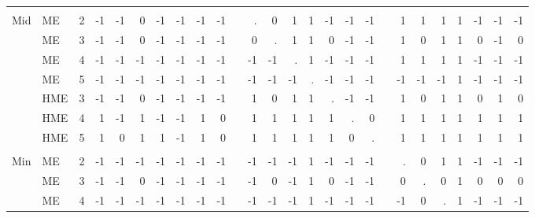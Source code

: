 \documentclass[12pt]{article}
\theoremstyle{definition}
\begin{document}
\begin{landscape}
\begin{table}[t!]
\begin{threeparttable}
{\begin{tabular}[r]{l l l r r r r r r r r r r r r r r r r r r r r r r r}
         &     &         &     &     &     &     &      &      &              &&     &     &     &     &      &      &              &&     &     &     &     &      &      &          \\
Mid      & ME  & 2       & -1  & -1  &  0  & -1  & -1   & -1   &  -1          &&  .  &   0 &  1  &  1  & -1   & -1   &  -1          &&  1  &  1  &  1  &  1  & -1   & -1   & -1       \\
         & ME  & 3       & -1  & -1  &  0  & -1  & -1   & -1   &  -1          &&  0  &   . &  1  &  1  &  0   & -1   &  -1          &&  1  &  0  &  1  &  1  &  0   & -1   &  0       \\
         & ME  & 4       & -1  & -1  & -1  & -1  & -1   & -1   &  -1          && -1  &  -1 &  .  &  1  & -1   & -1   &  -1          &&  1  &  1  &  1  &  1  & -1   & -1   & -1       \\
         & ME  & 5       & -1  & -1  & -1  & -1  & -1   & -1   &  -1          && -1  &  -1 & -1  &  .  & -1   & -1   &  -1          && -1  & -1  & -1  &  1  & -1   & -1   & -1       \\
         & HME & 3       & -1  & -1  &  0  & -1  & -1   & -1   &  -1          &&  1  &   0 &  1  &  1  &  .   & -1   &  -1          &&  1  &  0  &  1  &  1  &  0   &  1   &  0       \\
         & HME & 4       &  1  & -1  &  1  & -1  & -1   &  1   &   0          &&  1  &   1 &  1  &  1  &  1   &  .   &   0          &&  1  &  1  &  1  &  1  &  1   &  1   &  1       \\
         & HME & 5       &  1  &  0  &  1  &  1  & -1   &  1   &   0          &&  1  &   1 &  1  &  1  &  1   &  0   &   .          &&  1  &  1  &  1  &  1  &  1   &  1   &  1       \\
         &     &         &     &     &     &     &      &      &              &&     &     &     &     &      &      &              &&     &     &     &     &      &      &          \\
Min      & ME  & 2       & -1  & -1  & -1  & -1  & -1   & -1   &  -1          && -1  &  -1 & -1  &  1  & -1   & -1   &  -1          &&  .  &  0  &  1  &  1  & -1   & -1   & -1       \\
         & ME  & 3       & -1  & -1  &  0  & -1  & -1   & -1   &  -1          && -1  &   0 & -1  &  1  &  0   & -1   &  -1          &&  0  &  .  &  0  &  1  &  0   &  0   &  0       \\
         & ME  & 4       & -1  & -1  & -1  & -1  & -1   & -1   &  -1          && -1  &  -1 & -1  &  1  & -1   & -1   &  -1          && -1  &  0  &  .  &  1  & -1   & -1   & -1       \\

\end{tabular}}
\end{threeparttable}
\end{table}
\end{landscape}
\end{document}
